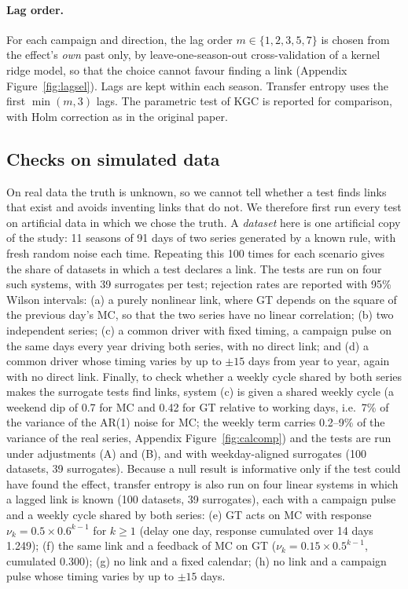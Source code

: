 \documentclass[11pt,a4paper]{article}
\begin{document}
\paragraph{Lag order.} For each campaign and direction, the lag order $m\in\{1,2,3,5,7\}$ is chosen from the effect's \emph{own} past only, by leave-one-season-out cross-validation of a kernel ridge model, so that the choice cannot favour finding a link (Appendix Figure~\ref{fig:lagsel}). Lags are kept within each season. Transfer entropy uses the first $\min(m,3)$ lags. The parametric test of KGC is reported for comparison, with Holm correction as in the original paper.

\subsection{Checks on simulated data}\label{sec:simulation}
On real data the truth is unknown, so we cannot tell whether a test finds links that exist and avoids inventing links that do not. We therefore first run every test on artificial data in which we chose the truth. A \emph{dataset} here is one artificial copy of the study: 11 seasons of 91 days of two series generated by a known rule, with fresh random noise each time. Repeating this 100 times for each scenario gives the share of datasets in which a test declares a link. The tests are run on four such systems, with 39 surrogates per test; rejection rates are reported with 95\% Wilson intervals: (a) a purely nonlinear link, where GT depends on the square of the previous day's MC, so that the two series have no linear correlation; (b) two independent series; (c) a common driver with fixed timing, a campaign pulse on the same days every year driving both series, with no direct link; and (d) a common driver whose timing varies by up to $\pm15$ days from year to year, again with no direct link. Finally, to check whether a weekly cycle shared by both series makes the surrogate tests find links, system (c) is given a shared weekly cycle (a weekend dip of 0.7 for MC and 0.42 for GT relative to working days, i.e.\ 7\% of the variance of the AR(1) noise for MC; the weekly term carries 0.2--9\% of the variance of the real series, Appendix Figure~\ref{fig:calcomp}) and the tests are run under adjustments (A) and (B), and with weekday-aligned surrogates (100 datasets, 39 surrogates). Because a null result is informative only if the test could have found the effect, transfer entropy is also run on four linear systems in which a lagged link is known (100 datasets, 39 surrogates), each with a campaign pulse and a weekly cycle shared by both series: (e) GT acts on MC with response $\nu_k=0.5\times0.6^{k-1}$ for $k\ge1$ (delay one day, response cumulated over 14 days 1.249); (f) the same link and a feedback of MC on GT ($\nu_k=0.15\times0.5^{k-1}$, cumulated 0.300); (g) no link and a fixed calendar; (h) no link and a campaign pulse whose timing varies by up to $\pm15$ days.
\end{document}
